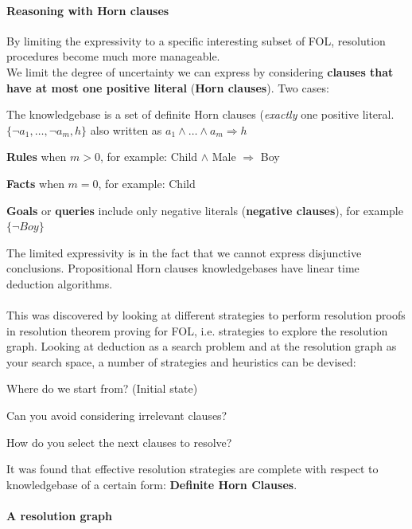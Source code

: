 \documentclass[10pt]{report}
\begin{document}
\paragraph{Reasoning with Horn clauses} By limiting the expressivity to a specific interesting subset of FOL, resolution procedures become much more manageable.\\
We limit the degree of uncertainty we can express by considering \textbf{clauses that have at most one positive literal} (\textbf{Horn clauses}). Two cases:
\begin{list}{}{}
	\item The knowledgebase is a set of definite Horn clauses (\textit{exactly} one positive literal.\\
	$\{\neg a_1,\ldots,\neg a_m, h\}$ also written as $a_1\wedge\ldots\wedge a_m \Rightarrow h$
	\begin{list}{}{}
		\item \textbf{Rules} when $m>0$, for example: Child $\wedge$ Male $\Rightarrow$ Boy
		\item \textbf{Facts} when $m=0$, for example: Child
	\end{list}
	\item \textbf{Goals} or \textbf{queries} include only negative literals (\textbf{negative clauses}), for example $\{\neg Boy\}$
\end{list}
The limited expressivity is in the fact that we cannot express disjunctive conclusions. Propositional Horn clauses knowledgebases have linear time deduction algorithms.\\\\
This was discovered by looking at different strategies to perform resolution proofs in resolution theorem proving for FOL, i.e. strategies to explore the resolution graph. Looking at deduction as a search problem and at the resolution graph as your search space, a number of strategies and heuristics can be devised:
\begin{list}{}{}
	\item Where do we start from? (Initial state)
	\item Can you avoid considering irrelevant clauses?
	\item How do you select the next clauses to resolve?
\end{list}
It was found that effective resolution strategies are complete with respect to knowledgebase of a certain form: \textbf{Definite Horn Clauses}.
\paragraph{A resolution graph}
\begin{center}
\end{center}
\end{document}

